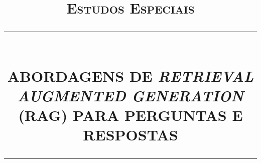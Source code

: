 \newcommand{\HRule}[1]{\rule{\linewidth}{#1}}
\begin{titlepage}
    \title{
        \normalsize  \textsc{Estudos Especiais} \\ [2.0cm]
		\HRule{0.5pt} \\  [0.75cm]
		\LARGE \textbf{\uppercase{ABORDAGENS DE \textit{RETRIEVAL AUGMENTED GENERATION} (RAG) PARA PERGUNTAS E RESPOSTAS}} \\ [1.3cm]
		\HRule{1.5pt} \\ [0.5cm]
		\normalsize \vspace*{5\baselineskip}
	}

	\date{}

    \maketitle
    \thispagestyle{empty}
\end{titlepage}